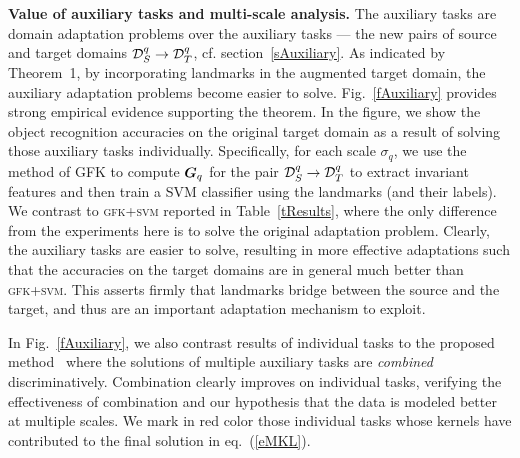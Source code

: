 {\bf Value of auxiliary tasks and multi-scale analysis.} The auxiliary tasks are domain adaptation problems over the auxiliary tasks --- the new pairs of source and target domains $\mathcal{D}_{S}^q \rightarrow \mathcal{D}_{T}^q$, cf. section~\ref{sAuxiliary}. As indicated by Theorem~1, by incorporating landmarks in the augmented target domain, the auxiliary adaptation problems become easier to solve. Fig.~\ref{fAuxiliary} provides strong empirical evidence supporting the theorem.  In the figure, we show the object recognition accuracies on the original target domain as a result of solving those auxiliary tasks individually.  Specifically, for each scale $\sigma_q$, we use the method of GFK to compute $\boldsymbol{G}_q$ for the pair $\mathcal{D}_{S}^q \rightarrow \mathcal{D}_{T}^q$ to extract invariant features and then train a SVM classifier using the landmarks (and their labels).  We contrast to \textsc{gfk+svm} reported in Table~\ref{tResults}, where the only difference from the experiments here is to solve the original adaptation problem. Clearly, the auxiliary tasks are easier to solve, resulting in more effective adaptations such that the accuracies on the target domains are in general much better than \textsc{gfk+svm}. This asserts firmly that landmarks bridge between the source and the target, and thus are an important adaptation mechanism to exploit.

In  Fig.~\ref{fAuxiliary}, we also contrast results of individual tasks to the proposed method \ours\ where the solutions of multiple auxiliary tasks are \emph{combined} discriminatively. Combination clearly improves on individual tasks, verifying the effectiveness of combination and our hypothesis that the data is modeled better at multiple scales. We mark in red color those individual tasks whose kernels have contributed to the final solution in eq.~(\ref{eMKL}). 




